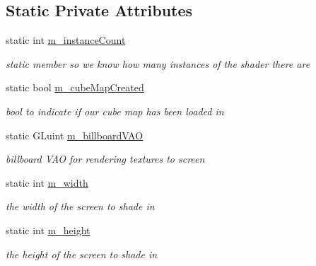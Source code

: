 \subsection*{Static Private Attributes}
\begin{DoxyCompactItemize}
\item 
\hypertarget{class_fluid_shader_a7222716799d6097618fce425d1da13fc}{static int \hyperlink{class_fluid_shader_a7222716799d6097618fce425d1da13fc}{m\-\_\-instance\-Count}}\label{class_fluid_shader_a7222716799d6097618fce425d1da13fc}

\begin{DoxyCompactList}\small\item\em static member so we know how many instances of the shader there are \end{DoxyCompactList}\item 
\hypertarget{class_fluid_shader_adeec5576690fb6c4bff765932037e286}{static bool \hyperlink{class_fluid_shader_adeec5576690fb6c4bff765932037e286}{m\-\_\-cube\-Map\-Created}}\label{class_fluid_shader_adeec5576690fb6c4bff765932037e286}

\begin{DoxyCompactList}\small\item\em bool to indicate if our cube map has been loaded in \end{DoxyCompactList}\item 
\hypertarget{class_fluid_shader_ade4ee84f9ee1068e17ba3a0e980aa11b}{static G\-Luint \hyperlink{class_fluid_shader_ade4ee84f9ee1068e17ba3a0e980aa11b}{m\-\_\-billboard\-V\-A\-O}}\label{class_fluid_shader_ade4ee84f9ee1068e17ba3a0e980aa11b}

\begin{DoxyCompactList}\small\item\em billboard V\-A\-O for rendering textures to screen \end{DoxyCompactList}\item 
\hypertarget{class_fluid_shader_aab541db2bd8b6063bb98d4d1d94d8d13}{static int \hyperlink{class_fluid_shader_aab541db2bd8b6063bb98d4d1d94d8d13}{m\-\_\-width}}\label{class_fluid_shader_aab541db2bd8b6063bb98d4d1d94d8d13}

\begin{DoxyCompactList}\small\item\em the width of the screen to shade in \end{DoxyCompactList}\item 
\hypertarget{class_fluid_shader_a85d49ca361e2b85558466c9db1215c24}{static int \hyperlink{class_fluid_shader_a85d49ca361e2b85558466c9db1215c24}{m\-\_\-height}}\label{class_fluid_shader_a85d49ca361e2b85558466c9db1215c24}

\begin{DoxyCompactList}\small\item\em the height of the screen to shade in \end{DoxyCompactList}\end{DoxyCompactItemize}


